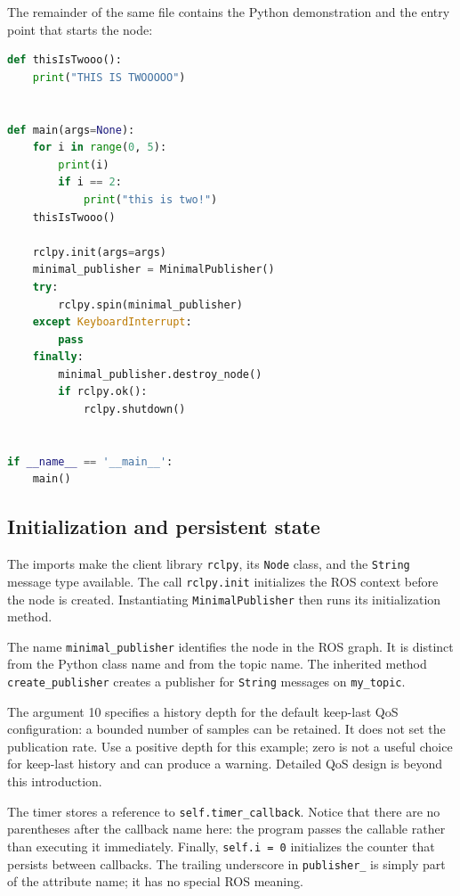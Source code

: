 \begin{minipage}{\linewidth}
The remainder of the same file contains the Python demonstration and the
entry point that starts the node:
\begin{lstlisting}[style=robotcode,language=Python]
def thisIsTwooo():
    print("THIS IS TWOOOOO")


def main(args=None):
    for i in range(0, 5):
        print(i)
        if i == 2:
            print("this is two!")
    thisIsTwooo()

    rclpy.init(args=args)
    minimal_publisher = MinimalPublisher()
    try:
        rclpy.spin(minimal_publisher)
    except KeyboardInterrupt:
        pass
    finally:
        minimal_publisher.destroy_node()
        if rclpy.ok():
            rclpy.shutdown()


if __name__ == '__main__':
    main()
\end{lstlisting}
\end{minipage}

\subsection{Initialization and persistent state}
The imports make the client library \texttt{rclpy}, its \texttt{Node}
class, and the \texttt{String} message type available. The call
\texttt{rclpy.init} initializes the ROS context before the node is created.
Instantiating \texttt{MinimalPublisher} then runs its initialization method.

The name \texttt{minimal\_publisher} identifies the node in the ROS graph.
It is distinct from the Python class name and from the topic name.
The inherited method \texttt{create\_publisher} creates a publisher for
\texttt{String} messages on \texttt{my\_topic}.

The argument 10 specifies a history depth for the default keep-last QoS
configuration: a bounded number of samples can be retained. It does not
set the publication rate. Use a positive depth for this example; zero
is not a useful choice for keep-last history and can produce a warning.
Detailed QoS design is beyond this introduction.

The timer stores a reference to \texttt{self.timer\_callback}. Notice
that there are no parentheses after the callback name here: the program
passes the callable rather than executing it immediately. Finally,
\texttt{self.i = 0} initializes the counter that persists between callbacks.
The trailing underscore in \texttt{publisher\_} is simply part of the
attribute name; it has no special ROS meaning.

